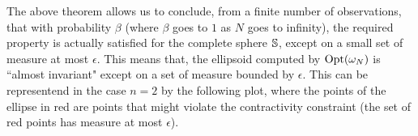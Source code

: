 


The above theorem allows us to conclude, from a finite number of observations, that with probability $\beta$ (where $\beta$ goes to $1$ as $N$ goes to infinity), the required property is actually satisfied for the complete sphere $\mathbb{S}$, except on a small set of measure at most $\epsilon$. This means that, the ellipsoid computed by $\text{Opt}(\omega_N)$ is ``almost invariant"  except on a set of measure bounded by $\epsilon$. This can be representend in the case $n=2$ by the following plot, where the points of the ellipse in red are points that might violate the contractivity constraint (the set of red points has measure at most $\epsilon$).


